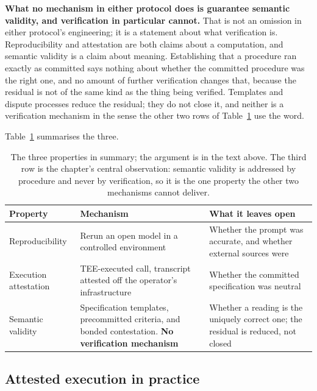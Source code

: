 \textbf{What no mechanism in either protocol does is guarantee semantic validity, and
verification in particular cannot.} That is not an omission in either protocol's
engineering; it is a statement about what verification is. Reproducibility and attestation
are both claims about a computation, and semantic validity is a claim about meaning.
Establishing that a procedure ran exactly as committed says nothing about whether the
committed procedure was the right one, and no amount of further verification changes that,
because the residual is not of the same kind as the thing being verified. Templates and
dispute processes reduce the residual; they do not close it, and neither is a verification
mechanism in the sense the other two rows of Table~\ref{tab:threelayer} use the word.

Table~\ref{tab:threelayer} summarises the three.

\begin{table}[htbp]
\centering
\begin{tabularx}{\textwidth}{p{}p{}X}
\toprule
\textbf{Property} & \textbf{Mechanism} & \textbf{What it leaves open} \\
\midrule
Reproducibility & Rerun an open model in a controlled environment & Whether the prompt was accurate, and whether external sources were \\
Execution attestation & TEE-executed call, transcript attested off the operator's infrastructure & Whether the committed specification was neutral \\
Semantic validity & Specification templates, precommitted criteria, and bonded contestation. \textbf{No verification mechanism} & Whether a reading is the uniquely correct one; the residual is reduced, not closed \\
\bottomrule
\end{tabularx}
\caption{The three properties in summary; the argument is in the text above. The third row is
the chapter's central observation: semantic validity is addressed by procedure and never by
verification, so it is the one property the other two mechanisms cannot deliver.}
\label{tab:threelayer}
\end{table}

\subsection*{Attested execution in practice}

